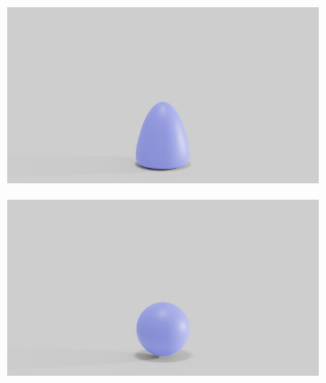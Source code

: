\begin{figure}
\begin{subfigure}{.16\linewidth}
		\label{sfig:ball-045-5}
	\end{subfigure}%
	\begin{subfigure}{.16\linewidth}
		\centering
		{\includegraphics[width=2.0\textwidth]{images/soft_ball/045/0450.jpg}}
		\label{sfig:ball-045-6}
	\end{subfigure}\hfill
	\begin{subfigure}{.03\linewidth}
	\end{subfigure}%
	\begin{subfigure}{.16\linewidth}
		\centering
		{\includegraphics[width=2.0\textwidth]{images/soft_ball/0495/0200.jpg}}
		\label{sfig:ball-0495-1}
	\end{subfigure}%
	\begin{subfigure}{.16\linewidth}
		\centering

\end{subfigure}
\end{figure}

